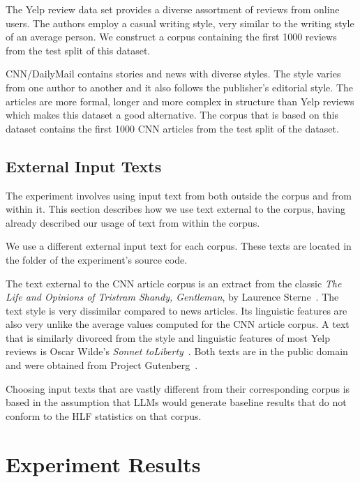 \documentclass[11pt]{article}
\begin{document}
The Yelp review data set provides a diverse assortment of reviews from online
users.
The authors employ a casual writing style, very similar to the writing style of
an average person.
We construct a corpus containing the first 1000 reviews from the test split of
this dataset.

CNN/DailyMail contains stories and news with diverse styles.
The style varies from one author to another and it also follows the publisher's
editorial style.
The articles are more formal, longer and more complex in structure than Yelp
reviews which makes this dataset a good alternative.
The corpus that is based on this dataset contains the first 1000 CNN articles
from the test split of the dataset.

\subsection{External Input Texts}\label{input-text}

The experiment involves using input text from both outside the corpus and from
within it.
This section describes how we use text external to the corpus, having already
described our usage of text from within the corpus.

We use a different external input text for each corpus.
These texts are located in the
\texttt{}
folder of the experiment's source code.

The text external to the CNN article corpus is an extract from the classic
\textit{The Life and Opinions of Tristram Shandy, Gentleman}, by Laurence
Sterne~\cite{sterne2003life}.
The text style is very dissimilar compared to news articles.
Its linguistic features are also very unlike the average values computed for the
CNN article corpus.
A text that is similarly divorced from the style and linguistic features of most
Yelp reviews is Oscar Wilde's \textit{Sonnet toLiberty}~\cite{wilde1909poems}.
Both texts are in the public domain and were obtained from Project
Gutenberg~\cite{gutenberg}.

Choosing input texts that are vastly different from their corresponding corpus
is based in the assumption that LLMs would generate baseline results that do not
conform to the HLF statistics on that corpus.

\section{Experiment Results}
\end{document}
